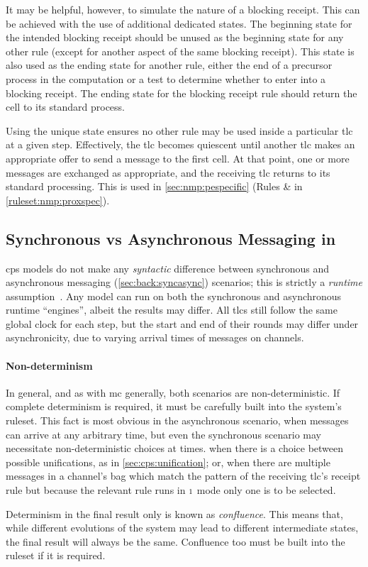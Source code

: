 It may be helpful, however, to simulate the nature of a blocking receipt.  This can be achieved with the use of additional dedicated states.  The beginning state for the intended blocking receipt should be unused as the beginning state for any other rule (except for another aspect of the same blocking receipt).  This state is also used as the ending state for another rule, either the end of a precursor process in the computation or a test to determine whether to enter into a blocking receipt.  The ending state for the blocking receipt rule should return the cell to its standard process.

Using the unique state ensures no other rule may be used inside a particular \gls{tlc} at a given step.  Effectively, the \gls{tlc} becomes quiescent until another \gls{tlc} makes an appropriate offer to send a message to the first cell.  At that point, one or more messages are exchanged as appropriate, and the receiving \gls{tlc} returns to its standard processing.  This is used \eg{} in \cref{sec:nmp:pespecific} (Rules  \&  in \vref{ruleset:nmp:proxspec}).


\subsection{\label{sec:cps:syncasync}Synchronous vs Asynchronous Messaging in }

\gls{cps} models do not make any \emph{syntactic} difference between synchronous and asynchronous messaging (\cref{sec:back:syncasync}) scenarios;
this is strictly a \emph{runtime} assumption~\cite{Nicolescu2012}.
Any model can run on both the synchronous and asynchronous runtime ``engines'', albeit the results may differ.  All \glspl{tlc} still follow the same global clock for each step, but the start and end of their rounds may differ under asynchronicity, due to varying arrival times of messages on channels.

\paragraph{Non-determinism}
In general, and as with \gls{mc} generally, both scenarios are non-deterministic.  If complete determinism is required, it must be carefully built into the system's \gls{ruleset}.  This fact is most obvious in the asynchronous scenario, when messages can arrive at any arbitrary time, but even the synchronous scenario may necessitate non-deterministic choices at times. \Eg{} when there is a choice between possible
unifications, as in \cref{sec:cps:unification}; or, when there are multiple messages in a channel’s bag
which match the pattern of the receiving \gls{tlc}’s receipt rule but because the relevant rule runs in \({\scriptstyle 1}\) mode only one is to be selected.

Determinism in the final result only is known as \emph{confluence}.  This means that, while different evolutions of the system may lead to different intermediate states, the final result will always be the same.  Confluence too must be built into the \gls{ruleset} if it is required.